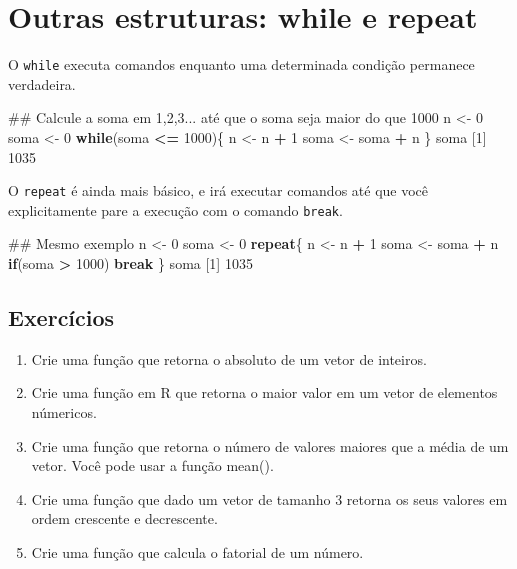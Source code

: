 \documentclass[10pt,a4paper]{book}
\newenvironment{Shaded}{\begin{snugshade}}{\end{snugshade}}
\newcommand{\DecValTok}[1]{\textcolor[rgb]{0.00,0.00,0.81}{#1}}
\newcommand{\StringTok}[1]{\textcolor[rgb]{0.31,0.60,0.02}{#1}}
\newcommand{\ControlFlowTok}[1]{\textcolor[rgb]{0.13,0.29,0.53}{\textbf{#1}}}
\newcommand{\OperatorTok}[1]{\textcolor[rgb]{0.81,0.36,0.00}{\textbf{#1}}}
\newcommand{\NormalTok}[1]{#1}
\providecommand{\tightlist}{%
  \setlength{\itemsep}{0pt}\setlength{\parskip}{0pt}}
\begin{document}
\section{Outras estruturas: while e
repeat}\label{outras-estruturas-while-e-repeat}

O \texttt{while} executa comandos enquanto uma determinada condição
permanece verdadeira.

\begin{Shaded}
\begin{Highlighting}[]
\NormalTok{## Calcule a soma em 1,2,3... até que o soma seja maior do que 1000}
\NormalTok{n <-}\StringTok{ }\DecValTok{0}
\NormalTok{soma <-}\StringTok{ }\DecValTok{0}
\ControlFlowTok{while}\NormalTok{(soma }\OperatorTok{<=}\StringTok{ }\DecValTok{1000}\NormalTok{)\{}
\NormalTok{    n <-}\StringTok{ }\NormalTok{n }\OperatorTok{+}\StringTok{ }\DecValTok{1}
\NormalTok{    soma <-}\StringTok{ }\NormalTok{soma }\OperatorTok{+}\StringTok{ }\NormalTok{n}
\NormalTok{\}}
\NormalTok{soma}
\NormalTok{[}\DecValTok{1}\NormalTok{] }\DecValTok{1035}
\end{Highlighting}
\end{Shaded}

O \texttt{repeat} é ainda mais básico, e irá executar comandos até que
você explicitamente pare a execução com o comando \texttt{break}.

\begin{Shaded}
\begin{Highlighting}[]
\NormalTok{## Mesmo exemplo}
\NormalTok{n <-}\StringTok{ }\DecValTok{0}
\NormalTok{soma <-}\StringTok{ }\DecValTok{0}
\ControlFlowTok{repeat}\NormalTok{\{}
\NormalTok{    n <-}\StringTok{ }\NormalTok{n }\OperatorTok{+}\StringTok{ }\DecValTok{1}
\NormalTok{    soma <-}\StringTok{ }\NormalTok{soma }\OperatorTok{+}\StringTok{ }\NormalTok{n}
    \ControlFlowTok{if}\NormalTok{(soma }\OperatorTok{>}\StringTok{ }\DecValTok{1000}\NormalTok{) }\ControlFlowTok{break}
\NormalTok{\}}
\NormalTok{soma}
\NormalTok{[}\DecValTok{1}\NormalTok{] }\DecValTok{1035}
\end{Highlighting}
\end{Shaded}

\subsection*{Exercícios}\label{exercuxedcios-14}


\begin{enumerate}
\def\labelenumi{\arabic{enumi}.}
\tightlist
\item
  Crie uma função que retorna o absoluto de um vetor de inteiros.
\item
  Crie uma função em R que retorna o maior valor em um vetor de
  elementos númericos.
\item
  Crie uma função que retorna o número de valores maiores que a média de
  um vetor. Você pode usar a função mean().
\item
  Crie uma função que dado um vetor de tamanho 3 retorna os seus valores
  em ordem crescente e decrescente.
\item
  Crie uma função que calcula o fatorial de um número.
\end{enumerate}
\end{document}
